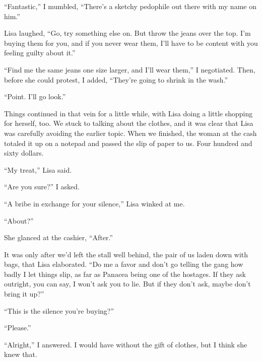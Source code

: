 ``Fantastic,'' I mumbled, ``There's a sketchy pedophile out there with my name on him.''



Lisa laughed, ``Go, try something else on.  But throw the jeans over the top.  I'm buying them for you, and if you never wear them, I'll have to be content with you feeling guilty about it.''



``Find me the same jeans one size larger, and I'll wear them,'' I negotiated.  Then, before she could protest, I added, ``They're going to shrink in the wash.''



``Point.  I'll go look.''



Things continued in that vein for a little while, with Lisa doing a little shopping for herself, too.  We stuck to talking about the clothes, and it was clear that Lisa was carefully avoiding the earlier topic.  When we finished, the woman at the cash totaled it up on a notepad and passed the slip of paper to us.  Four hundred and sixty dollars.



``My treat,'' Lisa said.



``Are you sure?'' I asked.



``A bribe in exchange for your silence,'' Lisa winked at me.



``About?''



She glanced at the cashier, ``After.''



It was only after we'd left the stall well behind, the pair of us laden down with bags, that Lisa elaborated. ``Do me a favor and don't go telling the gang how badly I let things slip, as far as Panacea being one of the hostages.  If they ask outright, you can say, I won't ask you to lie.  But if they don't ask, maybe don't bring it up?''



``This is the silence you're buying?''



``Please.''



``Alright,'' I answered.  I would have without the gift of clothes, but I think she knew that.



